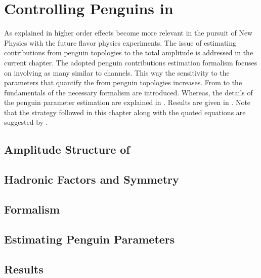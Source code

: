 
\chapter{Controlling Penguins in \phis}
\label{Penguins}

As explained in  higher order effects become more relevant in the pursuit
of New Physics with the future flavor physics experiments. The issue of estimating contributions from
penguin topologies to the total \BsJpsiPhi amplitude is addressed in the current chapter. The adopted
penguin contributions estimation formalism focuses on involving as many similar to \BsJpsiPhi channels.
This way the sensitivity to the parameters that quantify the from penguin topologies increases.
From  to  the fundamentals of the necessary formalism are introduced.
Whereas, the details of the penguin parameter estimation are explained in .
Results are given in . Note that the strategy followed in this chapter
along with the quoted equations are suggested by \cite{Fleischer:1999zi,Faller:2008gt,DeBruyn:2014oga}.

\section{Amplitude Structure of \BsJpsiPhi}
\label{jpsiphi_amp_struct}


\section{Hadronic Factors and \grpsuthree Symmetry}
\label{had_pars_suthree}


\section{Formalism}
\label{penguin_formalism}


\section{Estimating Penguin Parameters}
\label{penguin_more_chanells}


\section{Results}
\label{penguin_results}

